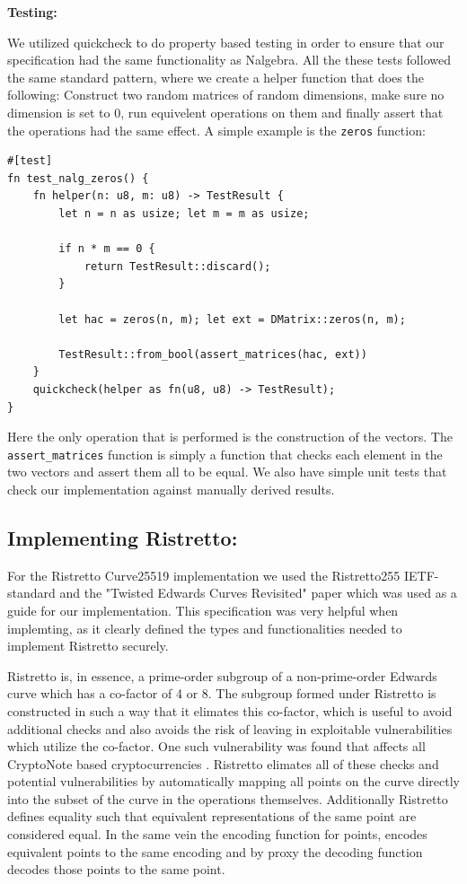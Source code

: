 \documentclass{article}
\begin{document}
\textbf{Testing:}

We utilized quickcheck to do property based testing in order to ensure
that our specification had the same functionality as Nalgebra. All
the these tests followed the same standard pattern, where we create a
helper function that does the following: Construct two random matrices
of random dimensions, make sure no dimension is set to 0, run equivelent
operations on them and finally assert that the operations had the same
effect. A simple example is the \texttt{zeros} function:

\begin{lstlisting}
#[test]
fn test_nalg_zeros() {
	fn helper(n: u8, m: u8) -> TestResult {
		let n = n as usize; let m = m as usize;

		if n * m == 0 {
		    return TestResult::discard();
		}

		let hac = zeros(n, m); let ext = DMatrix::zeros(n, m);

		TestResult::from_bool(assert_matrices(hac, ext))
	}
	quickcheck(helper as fn(u8, u8) -> TestResult);
}
\end{lstlisting}

Here the only operation that is performed is the construction of the
vectors. The \texttt{assert\_matrices} function is simply a function
that checks each element in the two vectors and assert them all to
be equal. We also have simple unit tests that check our implementation
against manually derived results.

\subsection{Implementing Ristretto:} \label{implementing-ristretto}

For the Ristretto Curve25519 implementation we used the Ristretto255
IETF-standard \cite{ristretto-ietf} and the "Twisted Edwards Curves
Revisited" paper \cite{edwards-curves} which was used as a guide for our
implementation. This specification was very helpful when implemting,
as it clearly defined the types and functionalities needed to implement
Ristretto securely.

Ristretto is, in essence, a prime-order subgroup of a non-prime-order
Edwards curve which has a co-factor of 4 or 8. The subgroup formed
under Ristretto is constructed in such a way that it elimates this
co-factor, which is useful to avoid additional checks and also avoids
the risk of leaving in exploitable vulnerabilities which utilize the
co-factor. One such vulnerability was found that affects all CryptoNote
based cryptocurrencies \cite{cryptonote}.  Ristretto elimates all of
these checks and potential vulnerabilities by automatically mapping
all points on the curve directly into the subset of the curve in the
operations themselves. Additionally Ristretto defines equality such that
equivalent representations of the same point are considered equal. In
the same vein the encoding function for points, encodes equivalent
points to the same encoding and by proxy the decoding function decodes
those points to the same point.
\end{document}
